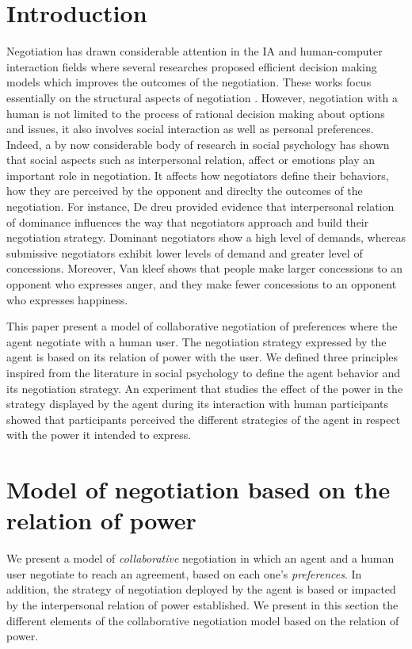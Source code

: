 \documentclass[runningheads,a4paper]{llncs}
\begin{document}
	
	\section{Introduction}
	Negotiation has drawn considerable attention in the IA and human-computer interaction fields where several researches proposed efficient decision making models which improves the outcomes of the negotiation. These works focus essentially on the structural aspects of negotiation \cite{sycara2010agent,lai2009generic}. 
	However, negotiation with a human  is not limited to the process of rational decision making about options and
	issues, it also involves social interaction as well as personal preferences. Indeed, a by now considerable body of research in social psychology has shown that social aspects such as interpersonal relation, affect or emotions play an important role in negotiation. It affects how negotiators define their behaviors, how they are perceived by the opponent and direclty the outcomes of the negotiation.
	For instance, De dreu\cite{de1995impact} provided evidence that interpersonal relation of dominance influences the way that negotiators approach and build their negotiation strategy. Dominant negotiators show a high level of demands, whereas submissive negotiators exhibit lower levels of demand and greater level of concessions. Moreover, Van kleef \cite{van2006power}	shows that people make larger concessions to an opponent who expresses anger, and they make fewer concessions to an opponent who 	expresses happiness.

	This paper present a model of collaborative negotiation of preferences where the agent negotiate with a human user. The negotiation strategy expressed by the agent is based on its relation of power with the user. We defined three principles inspired from the literature in social psychology to define the agent behavior and its negotiation strategy. An experiment that studies the effect of the power in the strategy displayed by the agent during its interaction with human participants showed that participants perceived the different strategies of the agent in respect with the power it intended to express. 
	

	
	
	\section{Model of negotiation based on the relation of power}
	We present a model of \textit{collaborative} negotiation in which an agent and a human user negotiate to reach an agreement, based on each one's \textit{preferences}. In addition, the strategy of negotiation deployed by the agent is based or impacted by the interpersonal relation of power established.
	We present in this section the different elements of the collaborative negotiation model based on the relation of power. 
\end{document}
